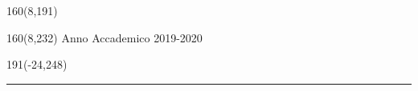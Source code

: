 %
\begin{textblock}{160}(8,191)
\end{textblock}
%
\begin{textblock}{160}(8,232)
\textblockcolour{}
\vspace{-\parskip}
\flushright
Anno Accademico 2019-2020
\end{textblock}
%
\begin{textblock}{191}(-24,248)
{\color{blueline}\rule{550pt}{5.5pt}}
\end{textblock}
%
\vfill
